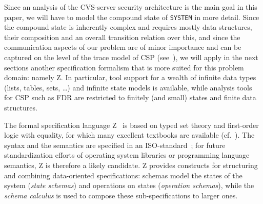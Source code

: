 Since an analysis of the CVS-server security architecture is the main
goal in this paper, we will have to model the compound state of
\texttt{SYSTEM} in more detail. Since the compound state is inherently
complex and requires mostly data structures, their composition and an
overall transition relation over this, and since the communication
aspects of our problem are of minor importance and can be captured on
the level of the trace model of CSP (see~\cite{roscoe:csp:98}), we
will apply in the next sections another specification formalism that
is more suited for this problem domain: namely Z. In particular, tool
support for a wealth of infinite data types (lists, tables, sets,
\ldots) and infinite state models is available, while analysis tools
for CSP such as FDR are restricted to finitely
(and small) states and finite data structures.

The formal specification language
Z~\cite{spivey:z_notation:1992} is based on typed set theory
and first-order logic with equality, for which many excellent
textbooks are available (cf.~\cite{woodcock.ea:using:1996}). The
syntax and the semantics are specified in an ISO-standard~\cite{iso:z:2000};
for future standardization efforts of operating system libraries or
programming language semantics, Z is therefore a likely candidate. Z
provides constructs for structuring and combining data-oriented
specifications: schemas model the states of the system (\emph{state
  schemas}) and operations on states
(\emph{operation schemas}), while the
\emph{schema calculus} is used to compose these
sub-specifications to larger ones.

